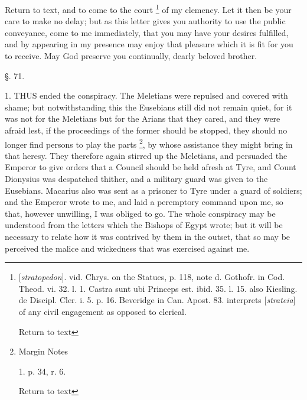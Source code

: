 {Return to text}, and to come to the court \footnote{[\emph{stratopedon}]. vid. Chrys. on the Statues, p. 118, note d.
Gothofr. in Cod. Theod. vi. 32. l. 1. Castra sunt ubi Princeps est.
ibid. 35. l. 15. also Kiesling. de Discipl. Cler. i. 5. p. 16.
Beveridge in Can. Apost. 83. interprets [\emph{strateia}] of any civil
engagement as opposed to clerical.

Return to text

} of my clemency. Let it then be your care to make no delay; but
as this letter gives you authority to use the public conveyance, come
to me immediately, that you may have your desires fulfilled, and by
appearing in my presence may enjoy that pleasure which it is fit for
you to receive. May God preserve you continually, dearly beloved
brother.


§. 71.

1. THUS
ended the conspiracy. The Meletians were repulsed and covered with
shame; but notwithstanding this the Eusebians still did not remain
quiet, for it was not for the Meletians but for the Arians that they
cared, and they were afraid lest, if the proceedings of the former
should be stopped, they should no longer find persons to play the
parts \footnote{Margin Notes

1. p. 34, r. 6.

Return to text}, by whose
assistance they might bring in that heresy. They therefore again
stirred up the Meletians, and persuaded the Emperor to give orders
that a Council should be held afresh at Tyre, and Count Dionysius was
despatched thither, and a military guard was given to the Eusebians.
Macarius also was sent as a prisoner to Tyre under a guard of
soldiers; and the Emperor wrote to me, and laid a peremptory command
upon me, so that, however unwilling, I was obliged to go. The whole
conspiracy may be understood from the letters which the Bishops of
Egypt wrote; but it will be necessary to relate how it was contrived
by them in the outset, that so may be perceived the malice and
wickedness that was exercised against me.

